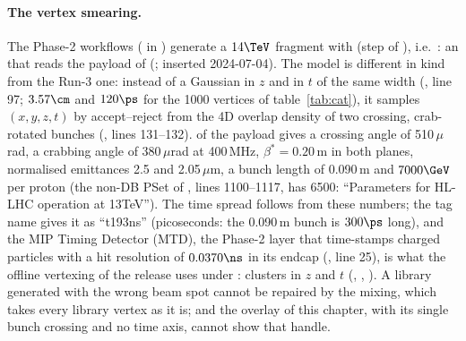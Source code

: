 \paragraph{The vertex smearing.} The Phase-2 workflows ( in )
generate a $14\TeV$ fragment with  (step  of
), i.e.\ : an
 that reads the payload 
of  (; inserted 2024-07-04). The model is different in kind
from the Run-3 one: instead of a Gaussian in $z$ and in $t$ of the same width (,
line 97; $3.57\cm$ and $120\ps$ for the 1000 vertices of table~\ref{tab:cat}), it samples $(x,y,z,t)$ by
accept--reject from the 4D overlap density of two crossing, crab-rotated bunches (,
lines 131--132).  of the payload gives a crossing angle of 510\,$\mu$rad, a crabbing angle of
380\,$\mu$rad at 400\,MHz, $\beta^\ast = 0.20$\,m in both planes, normalised emittances 2.5 and 2.05\,$\mu$m, a
bunch length of 0.090\,m and $7000\GeV$ per proton (the non-DB PSet of , lines
1100--1117, has 6500: ``Parameters for HL-LHC operation at 13TeV''). The time spread follows from these numbers;
the tag name gives it as ``t193ns'' (picoseconds: the 0.090\,m bunch is $300\ps$ long), and the MIP Timing
Detector (MTD), the Phase-2 layer that time-stamps charged particles with a hit resolution of $0.0370\ns$ in its
endcap (, line 25), is what the
offline vertexing of the release uses under : clusters in $z$ and $t$ (,
, ). A library
generated with the wrong beam spot cannot be repaired by the mixing, which takes every library vertex as it is; and
the overlay of this chapter, with its single bunch crossing and no time axis, cannot show that handle.
\par\endgroup
